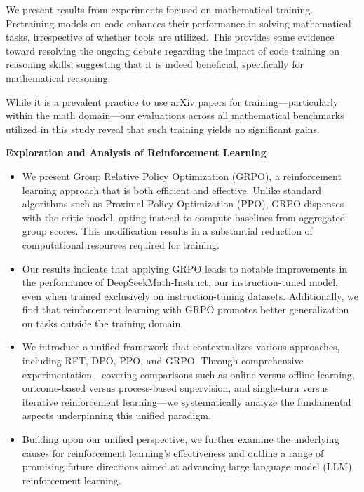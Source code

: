 \item We present results from experiments focused on mathematical training. Pretraining models on code enhances their performance in solving mathematical tasks, irrespective of whether tools are utilized. This provides some evidence toward resolving the ongoing debate regarding the impact of code training on reasoning skills, suggesting that it is indeed beneficial, specifically for mathematical reasoning.

\item While it is a prevalent practice to use arXiv papers for training—particularly within the math domain—our evaluations across all mathematical benchmarks utilized in this study reveal that such training yields no significant gains.

\textbf{Exploration and Analysis of Reinforcement Learning}

\begin{itemize}[topsep=0pt]
    \item We present Group Relative Policy Optimization (GRPO), a reinforcement learning approach that is both efficient and effective. Unlike standard algorithms such as Proximal Policy Optimization (PPO), GRPO dispenses with the critic model, opting instead to compute baselines from aggregated group scores. This modification results in a substantial reduction of computational resources required for training.
    \item Our results indicate that applying GRPO leads to notable improvements in the performance of DeepSeekMath-Instruct, our instruction-tuned model, even when trained exclusively on instruction-tuning datasets. Additionally, we find that reinforcement learning with GRPO promotes better generalization on tasks outside the training domain.
    \item We introduce a unified framework that contextualizes various approaches, including RFT, DPO, PPO, and GRPO. Through comprehensive experimentation—covering comparisons such as online versus offline learning, outcome-based versus process-based supervision, and single-turn versus iterative reinforcement learning—we systematically analyze the fundamental aspects underpinning this unified paradigm.
    \item Building upon our unified perspective, we further examine the underlying causes for reinforcement learning’s effectiveness and outline a range of promising future directions aimed at advancing large language model (LLM) reinforcement learning.
\end{itemize}

